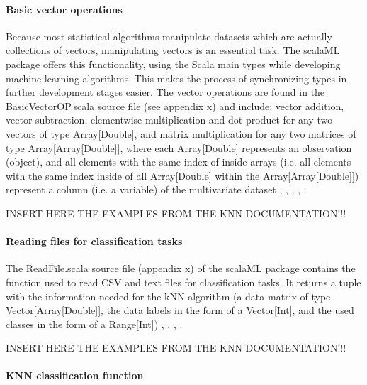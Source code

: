 \documentclass {article}
\begin{document}
\paragraph {Basic vector operations}

Because most statistical algorithms manipulate datasets which are actually collections of vectors, manipulating vectors is an essential task. The scalaML package offers this functionality, using the Scala main types while developing machine-learning algorithms. This makes the process of synchronizing types in further development stages easier.
 The vector operations are found in the BasicVectorOP.scala source file (see appendix x) and include: vector addition, vector subtraction, elementwise multiplication and dot product for any two vectors of type Array[Double], and matrix multiplication for any two matrices of type Array[Array[Double]], where each Array[Double] represents an observation (object), and all elements with the same index of inside arrays (i.e. all elements with the same index inside of all Array[Double] within the Array[Array[Double]]) represent a column (i.e. a variable) of the multivariate dataset \cite{dawkins_pauls_2005}, \cite{odersky_programming_2010}, \cite{swartz_learning_2015}, \cite{trask_grokking_2017}, \cite{noauthor_scala_2003}.

INSERT HERE THE EXAMPLES FROM THE KNN DOCUMENTATION!!!

\paragraph {Reading files for classification tasks}

The ReadFile.scala source file (appendix x) of the scalaML package contains the function used to read CSV and text files for classification tasks. It returns a tuple with the information needed for the kNN algorithm (a data matrix of type Vector[Array[Double]], the data labels in the form of a Vector[Int],  and the used classes in the form of a Range[Int]) \cite{harrington_machine_2012}, \cite{odersky_programming_2010}, \cite{swartz_learning_2015}, \cite{noauthor_scala_2003}.
 
INSERT HERE THE EXAMPLES FROM THE KNN DOCUMENTATION!!!

\paragraph {KNN classification function}
\end{document}
